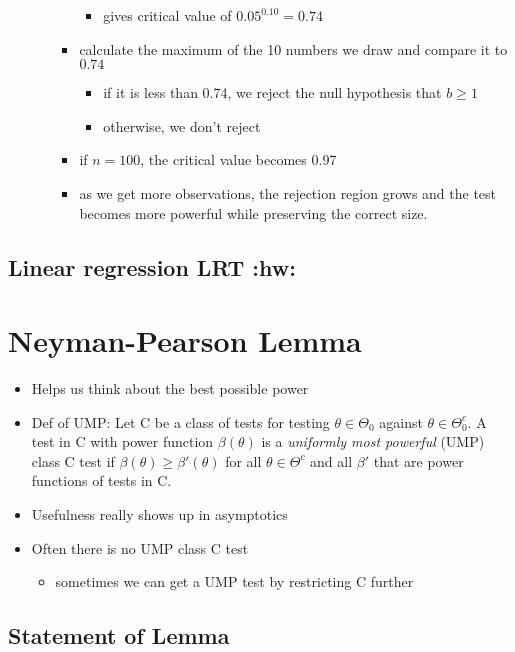 \begin{itemize}
\begin{itemize}
\begin{itemize}
\begin{itemize}
\item gives critical value of $0.05^{0.10} = 0.74$
\end{itemize}
\item calculate the maximum of the 10 numbers we draw and
          compare it to $0.74$
\begin{itemize}
\item if it is less than 0.74, we reject the null hypothesis
            that $b \geq 1$
\item otherwise, we don't reject
\end{itemize}
\item if $n = 100$, the critical value becomes 0.97
\item as we get more observations, the rejection region grows
          and the test becomes more powerful while preserving the
          correct size.
\end{itemize}
\end{itemize}
\end{itemize}

\subsection{Linear regression LRT \textbf{:hw:}}

\section{Neyman-Pearson Lemma}

\begin{itemize}
\item Helps us think about the best possible power
\item Def of UMP: Let C be a class of tests for testing $\theta \in
      \Theta_0$ against $\theta\in\Theta_0^c$.  A test in C with power
      function $\beta(\theta)$ is a \emph{uniformly most powerful} (UMP)
      class C test if $\beta(\theta) \geq \beta'(\theta)$ for all
      $\theta \in \Theta^c$ and all $\beta'$ that are power functions
      of tests in C.
\item Usefulness really shows up in asymptotics
\item Often there is no UMP class C test
\begin{itemize}
\item sometimes we can get a UMP test by restricting C further
\end{itemize}
\end{itemize}

\subsection{Statement of Lemma}

